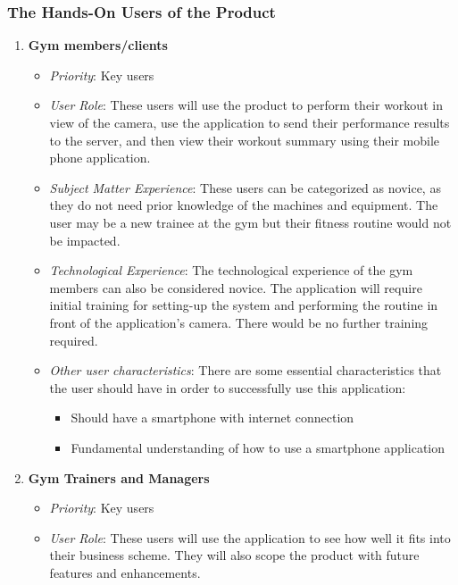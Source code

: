 \documentclass{article}
\begin{document}
\subsubsection{The Hands-On Users of the Product}
\begin{enumerate}
    \item \textbf{Gym members/clients}
    \begin{itemize}
    \item \textit{Priority}: Key users 
    \item \textit{User Role}: These users will use the product to perform their workout in view of the camera, use the application to send their performance results to the server, and then view their workout summary using their mobile phone application.
    
    \item \textit{Subject Matter Experience}: These users can be categorized as novice, as they do not need prior knowledge of the machines and equipment. The user may be a new trainee at the gym but their fitness routine would not be impacted.
 
    \item \textit{Technological Experience}: The technological experience of the gym members can also be considered novice. The application will require initial training for setting-up the system and performing the routine in front of the application’s camera. There would be no further training required.

    \item \textit{Other user characteristics}: There are some essential characteristics that the user should have in order to successfully use this application:
    \begin{itemize}
        \item Should have a smartphone with internet connection
        \item Fundamental understanding of how to use a smartphone application 
    \end{itemize}
    \end{itemize}
    
    \item \textbf{Gym Trainers and Managers}
    \begin{itemize}
    \item \textit{Priority}: Key users
    \item \textit{User Role}: These users will use the application to see how well it fits into their business scheme. They will also scope the product with future features and enhancements.
 

\end{itemize}
\end{enumerate}
\end{document}
